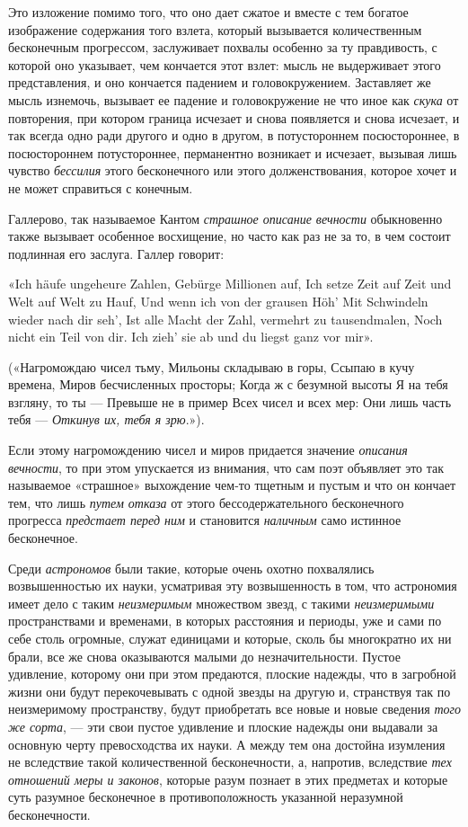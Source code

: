 Это изложение помимо того, что оно дает сжатое и вместе с тем богатое
изображение содержания того взлета, который вызывается количественным
бесконечным прогрессом, заслуживает похвалы особенно за ту правдивость, с
которой оно указывает, чем кончается этот взлет: мысль не выдерживает этого
представления, и оно кончается падением и головокружением. Заставляет же
мысль изнемочь, вызывает ее падение и головокружение не что иное как
{\em скука} от повторения, при котором граница исчезает
и снова появляется и снова исчезает, и так всегда одно ради другого и одно
в другом, в потустороннем посюстороннее, в посюстороннем потустороннее,
перманентно возникает и исчезает, вызывая лишь чувство
{\em бессилия} этого бесконечного или этого
долженствования, которое хочет и не может справиться с конечным.

Галлерово, так называемое Кантом {\em страшное описание
вечности} обыкновенно также вызывает особенное восхищение, но часто как раз
не за то, в чем состоит подлинная его заслуга.
Галлер говорит:

«Ich häufe ungeheure Zahlen,
Gebürge Millionen auf,
Ich setze Zeit auf Zeit und Welt auf Welt zu Hauf,
Und wenn ich von der grausen Höh'
Mit Schwindeln wieder nach dir seh',
Ist alle Macht der Zahl, vermehrt zu tausendmalen,
Noch nicht ein Teil von dir.
Ich zieh' sie ab und du liegst ganz vor mir».

(«Нагромождаю чисел тьму,
Мильоны складываю в горы,
Ссыпаю в кучу времена,
Миров бесчисленных просторы;
Когда ж с безумной высоты
Я на тебя взгляну, то ты —
Превыше не в пример
Всех чисел и всех мер:
Они лишь часть тебя —
{\em Откинув их, тебя я зрю}.»).

Если этому нагромождению чисел и миров придается значение
{\em описания вечности}, то при этом упускается из
внимания, что сам поэт объявляет это так называемое «страшное» выхождение
чем-то тщетным и пустым и что он кончает тем, что лишь
{\em путем отказа} от этого бессодержательного
бесконечного прогресса {\em предстает перед ним} и
становится {\em наличным} само истинное бесконечное.

Среди {\em астрономов} были такие, которые очень охотно
похвалялись возвышенностью их науки, усматривая эту возвышенность в том,
что астрономия имеет дело с таким {\em неизмеримым}
множеством звезд, с такими {\em неизмеримыми}
пространствами и временами, в которых расстояния и периоды, уже и сами по
себе столь огромные, служат единицами и которые, сколь бы многократно их ни
брали, все же снова оказываются малыми до незначительности. Пустое
удивление, которому они при этом предаются, плоские надежды, что в
загробной жизни они будут перекочевывать с одной звезды на другую и,
странствуя так по неизмеримому пространству, будут приобретать все новые и
новые сведения {\em того же сорта}, — эти свои пустое
удивление и плоские надежды они выдавали за основную черту превосходства их
науки. А между тем она достойна изумления не вследствие такой
количественной бесконечности, а, напротив, вследствие
{\em тех отношений меры и законов}, которые разум
познает в этих предметах и которые суть разумное бесконечное в
противоположность указанной неразумной бесконечности.

